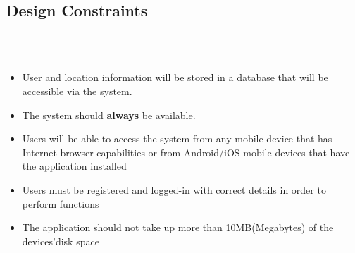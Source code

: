 
\subsection{Design Constraints}
\\ \\
\begin{itemize}
    \item User and location information will be stored in a database that will be accessible via the system.
    \item The system should \textbf{always} be available.
    \item Users will be able to access the system from any mobile device that has Internet browser capabilities or from Android/iOS mobile devices that have the application installed
    \item Users must be registered and logged-in with correct details in order to perform functions
    \item The application should not take up more than 10MB(Megabytes) of the devices'disk space
    
\end{itemize}
